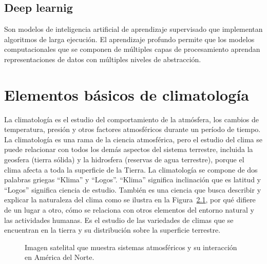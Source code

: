 \documentclass[
  us-letterpaper,
]{scrreprt}
\theoremstyle{plain}
\theoremstyle{definition}
\theoremstyle{definition}
\theoremstyle{remark}
\begin{document}
\section{Deep learnig}\label{deep-learnig}

Son modelos de inteligencia artificial de aprendizaje supervisado que
implementan algoritmos de larga ejecución. El aprendizaje profundo
permite que los modelos computacionales que se componen de múltiples
capas de procesamiento aprendan representaciones de datos con múltiples
niveles de abstracción.

\chapter{Elementos básicos de
climatología}\label{elementos-buxe1sicos-de-climatologuxeda}

La climatología es el estudio del comportamiento de la atmósfera, los
cambios de temperatura, presión y otros factores atmosféricos durante un
período de tiempo. La climatología es una rama de la ciencia
atmosférica, pero el estudio del clima se puede relacionar con todos los
demás aspectos del sistema terrestre, incluida la geosfera (tierra
sólida) y la hidrosfera (reservas de agua terrestre), porque el clima
afecta a toda la superficie de la Tierra. La climatología se compone de
dos palabras griegas ``Klima'' y ``Logos''. ``Klima'' significa
inclinación que es latitud y ``Logos'' significa ciencia de estudio.
También es una ciencia que busca describir y explicar la naturaleza del
clima como se ilustra en la Figura~\ref{fig-clima}, por qué difiere de
un lugar a otro, cómo se relaciona con otros elementos del entorno
natural y las actividades humanas. Es el estudio de las variedades de
climas que se encuentran en la tierra y su distribución sobre la
superficie terrestre.

\begin{figure}


\caption{\label{fig-clima}Imagen satelital que muestra sistemas
atmosféricos y su interacción en América del Norte.}

\end{figure}%
\end{document}

